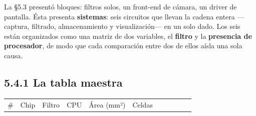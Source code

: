 La §5.3 presentó bloques: filtros solos, un front-end de cámara, un
driver de pantalla. Ésta presenta \textbf{sistemas}: seis circuitos que
llevan la cadena entera ---captura, filtrado, almacenamiento y
visualización--- en un solo dado. Los seis están organizados como una
matriz de dos variables, el \textbf{filtro} y la \textbf{presencia de
procesador}, de modo que cada comparación entre dos de ellos aísla una
sola causa.

\subsection{5.4.1 La tabla maestra}\label{la-tabla-maestra}

\begin{longtable}[]{@{}
  >{\raggedright\arraybackslash}p{}
  >{\raggedright\arraybackslash}p{}
  >{\raggedright\arraybackslash}p{}
  >{\centering\arraybackslash}p{}
  >{\raggedleft\arraybackslash}p{}
  >{\raggedleft\arraybackslash}p{}
  >{\raggedleft\arraybackslash}p{}
  >{\raggedleft\arraybackslash}p{}
  >{\centering\arraybackslash}p{}
  >{\centering\arraybackslash}p{}
  >{\centering\arraybackslash}p{}@{}}
\toprule\noalign{}
\begin{minipage}[b]{\linewidth}\raggedright
\#
\end{minipage} & \begin{minipage}[b]{\linewidth}\raggedright
Chip
\end{minipage} & \begin{minipage}[b]{\linewidth}\raggedright
Filtro
\end{minipage} & \begin{minipage}[b]{\linewidth}\centering
CPU
\end{minipage} & \begin{minipage}[b]{\linewidth}\raggedleft
Área (mm²)
\end{minipage} & \begin{minipage}[b]{\linewidth}\raggedleft
Celdas
\end{minipage} & \begin{minipage}[b]{\linewidth}\raggedleft

\end{minipage}
\end{longtable}
